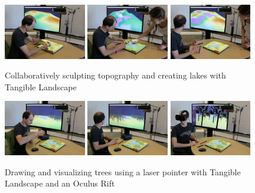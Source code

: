 \documentclass[prodmode,acmtochi]{acmsmall} %
\begin{document}
\begin{figure}
\begin{center}
		\includegraphics[width=0.32\textwidth]{images/immersive/sculpting_lakes_2.png}
		\includegraphics[width=0.32\textwidth]{images/immersive/sculpting_landforms_2.png}
		\includegraphics[width=0.32\textwidth]{images/immersive/sculpting_landforms_3.png}
	\caption{Collaboratively sculpting topography and creating lakes with Tangible Landscape}
	\label{fig:collaboration}
\end{center}
\end{figure}

\begin{figure}
\begin{center}
		\includegraphics[width=0.32\textwidth]{images/immersive/drawing_trees_1.png}
		\includegraphics[width=0.32\textwidth]{images/immersive/drawing_trees_2.png}
		\includegraphics[width=0.32\textwidth]{images/immersive/trees_with_oculus_1.png}
	\caption{Drawing and visualizing trees using a laser pointer with Tangible Landscape and an Oculus Rift}
	\label{fig:drawing_trees}
\end{center}
\end{figure}
\end{document}
